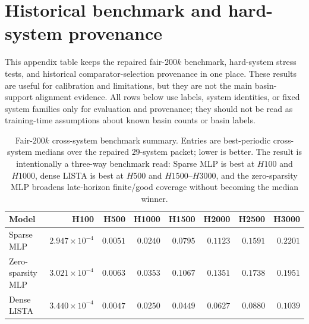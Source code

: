 \section{Historical benchmark and hard-system provenance}
\label{sec:supp_table_a6_historical_hard_system_provenance}

This appendix table keeps the repaired fair-\(200k\) benchmark, hard-system
stress tests, and historical comparator-selection provenance in one place. These
results are useful for calibration and limitations, but they are not the main
basin-support alignment evidence. All rows below use labels, system identities,
or fixed system families only for evaluation and provenance; they should not be
read as training-time assumptions about known basin counts or basin labels.

\begin{table}[tbp]
\centering
\caption{Fair-\(200k\) cross-system benchmark summary. Entries are
best-periodic cross-system medians over the repaired \(29\)-system packet;
lower is better. The result is intentionally a three-way benchmark read:
Sparse MLP is best at \(H100\) and \(H1000\), dense LISTA is best at \(H500\)
and \(H1500\)--\(H3000\), and the zero-sparsity MLP broadens late-horizon
finite/good coverage without becoming the median winner.}
\label{tab:a6_fair_200k_benchmark}
\scriptsize
\begin{tabular}{@{}lrrrrrrr@{}}
\toprule
Model & H100 & H500 & H1000 & H1500 & H2000 & H2500 & H3000 \\
\midrule
Sparse MLP & \(2.947{\times}10^{-4}\) & \(0.0051\) & \(0.0240\) & \(0.0795\) & \(0.1123\) & \(0.1591\) & \(0.2201\) \\
Zero-sparsity MLP & \(3.021{\times}10^{-4}\) & \(0.0063\) & \(0.0353\) & \(0.1067\) & \(0.1351\) & \(0.1738\) & \(0.1951\) \\
Dense LISTA & \(3.440{\times}10^{-4}\) & \(0.0047\) & \(0.0250\) & \(0.0449\) & \(0.0627\) & \(0.0880\) & \(0.1039\) \\
\bottomrule
\end{tabular}
\end{table}

